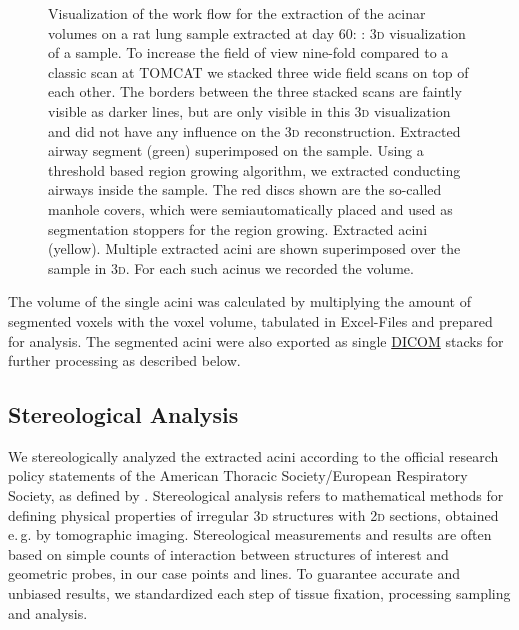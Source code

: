 \documentclass[%
	paper=a4,%
	abstract=true,%
	]{scrartcl}
\newlength\imagescale		%
\newcommand{\eg}{e.\,g.\xspace}
\newcommand{\twod}{2\textsc{d}\xspace}
\newcommand{\threed}{3\textsc{d}\xspace}
\begin{document}
\begin{figure}
{%
		\label{subfig:extracted acini}%
		}
	\caption{Visualization of the work flow for the extraction of the acinar volumes on a rat lung sample extracted at day 60: %
		: \threed visualization of a sample. To increase the field of view nine-fold compared to a classic scan at TOMCAT we stacked three wide field scans on top of each other. The borders between the three stacked scans are faintly visible as darker lines, but are only visible in this \threed visualization and did not have any influence on the \threed reconstruction. %
		 Extracted airway segment (green) superimposed on the sample. Using a threshold based region growing algorithm, we extracted conducting airways inside the sample. The red discs shown are the so-called manhole covers, which were semiautomatically placed and used as segmentation stoppers for the region growing. %
		 Extracted acini (yellow). Multiple extracted acini are shown superimposed over the sample in \threed. For each such acinus we recorded the volume.%
		}
	\label{fig:workflow}
\end{figure}

The volume of the single acini was calculated by multiplying the amount of segmented voxels with the voxel volume, tabulated in Excel-Files and prepared for analysis. The segmented acini were also exported as single \href{https://secure.wikimedia.org/wikipedia/en/w/index.php?title=Digital_Imaging_and_Communications_in_Medicine&oldid=415023605}{DICOM} stacks for further processing as described below.

\subsection{Stereological Analysis}
We stereologically analyzed the extracted acini according to the official research policy statements of the American Thoracic Society/European Respiratory Society, as defined by \citet{Hsia2010}. Stereological analysis refers to mathematical methods for defining physical properties of irregular \threed structures with \twod sections, obtained \eg by tomographic imaging. Stereological measurements and results are often based on simple counts of interaction between structures of interest and geometric probes, in our case points and lines. To guarantee accurate and unbiased results, we standardized each step of tissue fixation, processing sampling and analysis.
\end{document}
